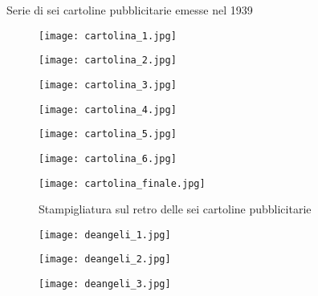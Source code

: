 Serie di sei cartoline pubblicitarie emesse nel 1939

\begin{figure}[h]
	\centering
		\texttt{[image: cartolina\_1.jpg]}
	\caption{}
	\label{fig:cartolina_1}
\end{figure}
\begin{figure}[h]
	\centering
		\texttt{[image: cartolina\_2.jpg]}
	\caption{}
	\label{fig:cartolina_2}
\end{figure}

\newpage

\begin{figure}[h]
	\centering
		\texttt{[image: cartolina\_3.jpg]}
	\caption{}
	\label{fig:cartolina_3}
\end{figure}
\begin{figure}[h]
	\centering
		\texttt{[image: cartolina\_4.jpg]}
	\caption{}
	\label{fig:cartolina_4}
\end{figure}

\newpage

\begin{figure}[h]
	\centering
		\texttt{[image: cartolina\_5.jpg]}
	\caption{}
	\label{fig:cartolina_5}
\end{figure}
\begin{figure}[h]
	\centering
		\texttt{[image: cartolina\_6.jpg]}
	\caption{}
	\label{fig:cartolina_6}
\end{figure}

\newpage

\begin{figure}[h]
	\centering
		\texttt{[image: cartolina\_finale.jpg]}
	\caption{Stampigliatura sul retro delle sei  cartoline pubblicitarie}
	\label{fig:cartolina_finale}
\end{figure}

\newpage

\begin{figure}[h]
	\centering
		\texttt{[image: deangeli\_1.jpg]}
	\caption{}
	\label{fig:deangeli_1}
\end{figure}
\begin{figure}[h]
	\centering
		\texttt{[image: deangeli\_2.jpg]}
	\caption{}
	\label{fig:deangeli_2}
\end{figure}
\begin{figure}[h]
	\centering
		\texttt{[image: deangeli\_3.jpg]}
	\caption{}
	\label{fig:deangeli_3}
\end{figure}


\clearpage
